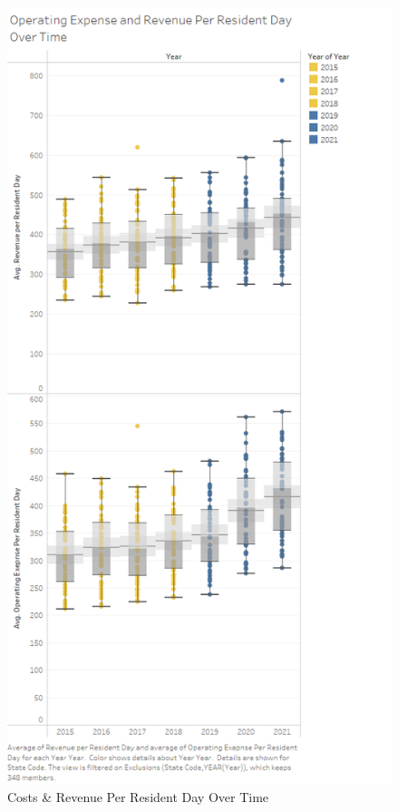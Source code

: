 \documentclass{article}
\theoremstyle{mytheoremstyle}
\theoremstyle{mytheoremstyle}
\theoremstyle{myproblemstyle}
\begin{document}
\begin{figure}[htbp]
\begin{minipage}{0.45\linewidth}
    \includegraphics[width=\linewidth]{Images/COVID Operating Expense and Revenue Per Resident Day.png}
    \caption{Costs \& Revenue Per Resident Day Over Time}
    \label{fig:ExpenseRevenue}
\end{minipage}\hfill
\end{figure}
\end{document}
